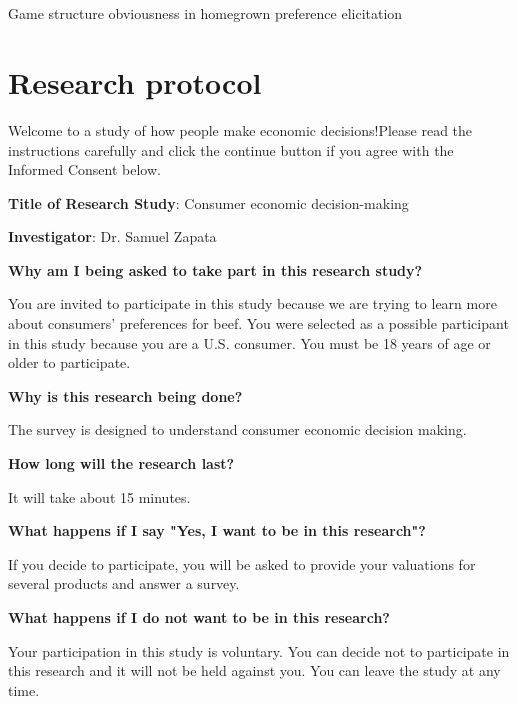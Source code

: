\documentclass[12pt]{article}
\begin{document}
	\section*{}
	{\centering \LARGE Game structure obviousness in homegrown preference elicitation
		
		\vspace{0.5cm}
		\renewcommand*{\thefootnote}{\fnsymbol{footnote}}
		\setcounter{footnote}{0}
		
		\large
        }


        
\section{Research protocol}

Welcome to a study of how people make economic decisions!Please read the instructions carefully and click the continue button if you agree with the Informed Consent below.

\textbf{Title of Research Study}: Consumer economic decision-making

\textbf{Investigator}: Dr. Samuel Zapata

\textbf{Why am I being asked to take part in this research study?}

You are invited to participate in this study because we are trying to learn more about consumers' preferences for beef. You were selected as a possible participant in this study because you are a U.S. consumer. You must be 18 years of age or older to participate. \par
\textbf{Why is this research being done?} \par

The survey is designed to understand consumer economic decision making. \par

\textbf{How long will the research last?} \par
It will take about 15 minutes. \par
\textbf{What happens if I say "Yes, I want to be in this research"?} \par
If you decide to participate, you will be asked to provide your valuations for several products and answer a survey. \par


\textbf{
What happens if I do not want to be in this research?} \par
Your participation in this study is voluntary. You can decide not to participate in this research and it will not be held against you. You can leave the study at any time. \par
\end{document}

